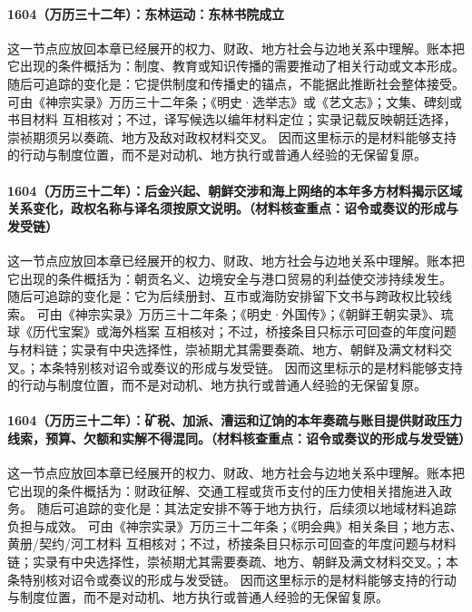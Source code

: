 \paragraph{1604（万历三十二年）：东林运动：东林书院成立} 这一节点应放回本章已经展开的权力、财政、地方社会与边地关系中理解。账本把它出现的条件概括为：制度、教育或知识传播的需要推动了相关行动或文本形成。 随后可追踪的变化是：它提供制度和传播史的锚点，不能据此推断社会整体接受。 可由《神宗实录》万历三十二年条；《明史·选举志》或《艺文志》；文集、碑刻或书目材料 互相核对；不过，译写候选以编年材料定位；实录记载反映朝廷选择，崇祯期须另以奏疏、地方及敌对政权材料交叉。 因而这里标示的是材料能够支持的行动与制度位置，而不是对动机、地方执行或普通人经验的无保留复原。

\paragraph{1604（万历三十二年）：后金兴起、朝鲜交涉和海上网络的本年多方材料揭示区域关系变化，政权名称与译名须按原文说明。（材料核查重点：诏令或奏议的形成与发受链）} 这一节点应放回本章已经展开的权力、财政、地方社会与边地关系中理解。账本把它出现的条件概括为：朝贡名义、边境安全与港口贸易的利益使交涉持续发生。 随后可追踪的变化是：它为后续册封、互市或海防安排留下文书与跨政权比较线索。 可由《神宗实录》万历三十二年条；《明史·外国传》；《朝鲜王朝实录》、琉球《历代宝案》或海外档案 互相核对；不过，桥接条目只标示可回查的年度问题与材料链；实录有中央选择性，崇祯期尤其需要奏疏、地方、朝鲜及满文材料交叉。；本条特别核对诏令或奏议的形成与发受链。 因而这里标示的是材料能够支持的行动与制度位置，而不是对动机、地方执行或普通人经验的无保留复原。

\paragraph{1604（万历三十二年）：矿税、加派、漕运和辽饷的本年奏疏与账目提供财政压力线索，预算、欠额和实解不得混同。（材料核查重点：诏令或奏议的形成与发受链）} 这一节点应放回本章已经展开的权力、财政、地方社会与边地关系中理解。账本把它出现的条件概括为：财政征解、交通工程或货币支付的压力使相关措施进入政务。 随后可追踪的变化是：其法定安排不等于地方执行，后续须以地域材料追踪负担与成效。 可由《神宗实录》万历三十二年条；《明会典》相关条目；地方志、黄册/契约/河工材料 互相核对；不过，桥接条目只标示可回查的年度问题与材料链；实录有中央选择性，崇祯期尤其需要奏疏、地方、朝鲜及满文材料交叉。；本条特别核对诏令或奏议的形成与发受链。 因而这里标示的是材料能够支持的行动与制度位置，而不是对动机、地方执行或普通人经验的无保留复原。

